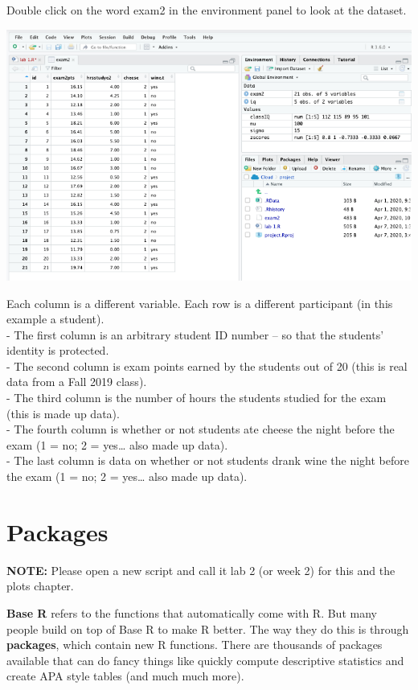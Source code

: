 \documentclass[
]{book}
\begin{document}
Double click on the word exam2 in the environment panel to look at the dataset.

\includegraphics{img/view.png}

Each column is a different variable. Each row is a different participant (in this example a student).\\
- The first column is an arbitrary student ID number -- so that the students' identity is protected.\\
- The second column is exam points earned by the students out of 20 (this is real data from a Fall 2019 class).\\
- The third column is the number of hours the students studied for the exam (this is made up data).\\
- The fourth column is whether or not students ate cheese the night before the exam (1 = no; 2 = yes\ldots{} also made up data).\\
- The last column is data on whether or not students drank wine the night before the exam (1 = no; 2 = yes\ldots{} also made up data).

\hypertarget{packages}{%
\chapter{Packages}\label{packages}}

\textbf{NOTE:} Please open a new script and call it lab 2 (or week 2) for this and the plots chapter.

\textbf{Base R} refers to the functions that automatically come with R. But many people build on top of Base R to make R better. The way they do this is through \textbf{packages}, which contain new R functions. There are thousands of packages available that can do fancy things like quickly compute descriptive statistics and create APA style tables (and much much more).
\end{document}
